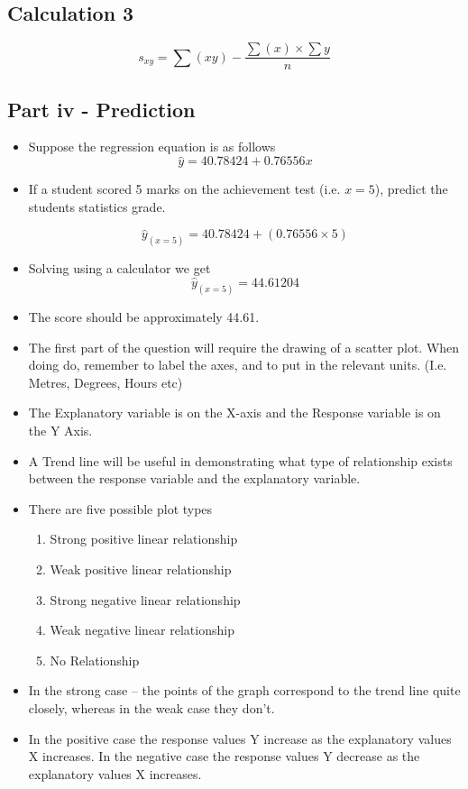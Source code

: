 \documentclass[]{report}
\begin{document}
\subsection*{Calculation 3}
\[ s_{xy}  = \sum(xy) - \frac{\sum(x)\times \sum{y}}{n} \]


\subsection*{Part iv - Prediction}
\begin{itemize}
	\item Suppose the regression equation is as follows
	\[ \hat{y} = 40.78424 + 0.76556 x \]
	\item If a student scored 5 marks on the achievement test (i.e. $x=5$), predict the students statistics grade.
	
	\[ \hat{y}_{(x=5)} = 40.78424 + (0.76556 \times 5) \]
	
	\item Solving using a calculator we get
	\[ \hat{y}_{(x=5)} = 44.61204 \]
	
	\item The score should be approximately 44.61.
\end{itemize}

\begin{itemize}
	\item 
	The first part of the question will require the drawing of a scatter plot. 
	When doing do, remember to label the axes, and to put in the relevant units. (I.e. Metres, Degrees, Hours etc)
	\item 
	The Explanatory variable is on the X-axis and the Response variable is on the Y Axis.
	\item 
	A Trend line will be useful in demonstrating what type of relationship exists between the response variable and the explanatory variable.
	\item There are five possible plot types
	
	
	
	\begin{enumerate}
		
		\item Strong positive linear relationship 
		\item Weak positive linear relationship
		\item Strong negative linear relationship
		\item Weak negative linear relationship
		\item No Relationship
	\end{enumerate}
	\item  In the strong case – the points of the graph correspond to the trend line quite closely, whereas in the weak case they don’t.
	\item In the positive case the response values Y increase as the explanatory values X increases. In the negative case the response values Y decrease as the explanatory values X increases. 
\end{itemize}
\end{document}

